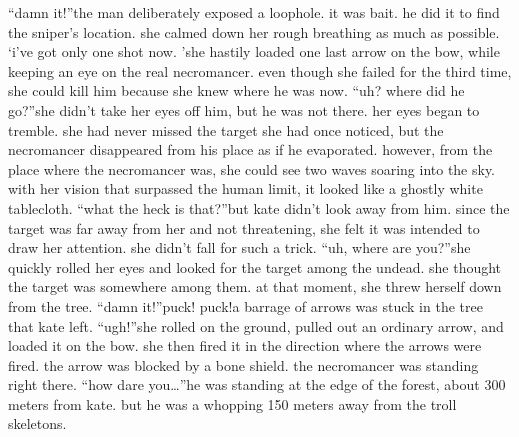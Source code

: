 “damn it!”the man deliberately exposed a loophole.
 it was bait.
 he did it to find the sniper’s location.
 she calmed down her rough breathing as much as possible.
‘i’ve got only one shot now.
’she hastily loaded one last arrow on the bow, while keeping an eye on the real necromancer.
 even though she failed for the third time, she could kill him because she knew where he was now.
“uh? where did he go?”she didn’t take her eyes off him, but he was not there.
 her eyes began to tremble.
she had never missed the target she had once noticed, but the necromancer disappeared from his place as if he evaporated.
however, from the place where the necromancer was, she could see two waves soaring into the sky.
 with her vision that surpassed the human limit, it looked like a ghostly white tablecloth.
“what the heck is that?”but kate didn’t look away from him.
 since the target was far away from her and not threatening, she felt it was intended to draw her attention.
 she didn’t fall for such a trick.
“uh, where are you?”she quickly rolled her eyes and looked for the target among the undead.
she thought the target was somewhere among them.
at that moment, she threw herself down from the tree.
“damn it!”puck! puck!a barrage of arrows was stuck in the tree that kate left.
“ugh!”she rolled on the ground, pulled out an ordinary arrow, and loaded it on the bow.
she then fired it in the direction where the arrows were fired.
the arrow was blocked by a bone shield.
 the necromancer was standing right there.
“how dare you…”he was standing at the edge of the forest, about 300 meters from kate.
but he was a whopping 150 meters away from the troll skeletons.

